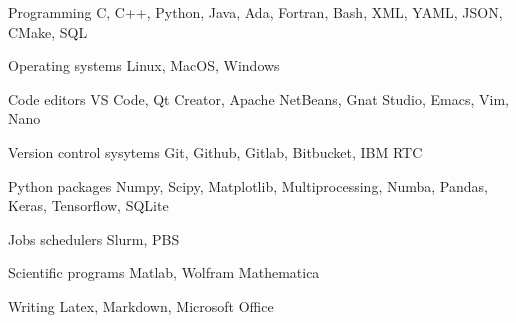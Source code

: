 

\begin{cvskills}

    \cvskill
    {Programming} %
    {C, C++, Python, Java, Ada, Fortran, Bash, XML, YAML, JSON, CMake, SQL} %

    \cvskill
    {Operating systems} %
    {Linux, MacOS, Windows} %

    \cvskill
    {Code editors} %
    {VS Code, Qt Creator, Apache NetBeans, Gnat Studio, Emacs, Vim, Nano} %

    \cvskill
    {Version control sysytems} %
    {Git, Github, Gitlab, Bitbucket, IBM RTC} %

    
    \cvskill
    {Python packages} %
    {Numpy, Scipy, Matplotlib, Multiprocessing, Numba, Pandas, Keras, Tensorflow, SQLite}

    \cvskill
    {Jobs schedulers} %
    {Slurm, PBS}
    
    \cvskill
    {Scientific programs} %
    {Matlab, Wolfram Mathematica} %

    \cvskill
    {Writing} %
    {Latex, Markdown, Microsoft Office} %

\end{cvskills}